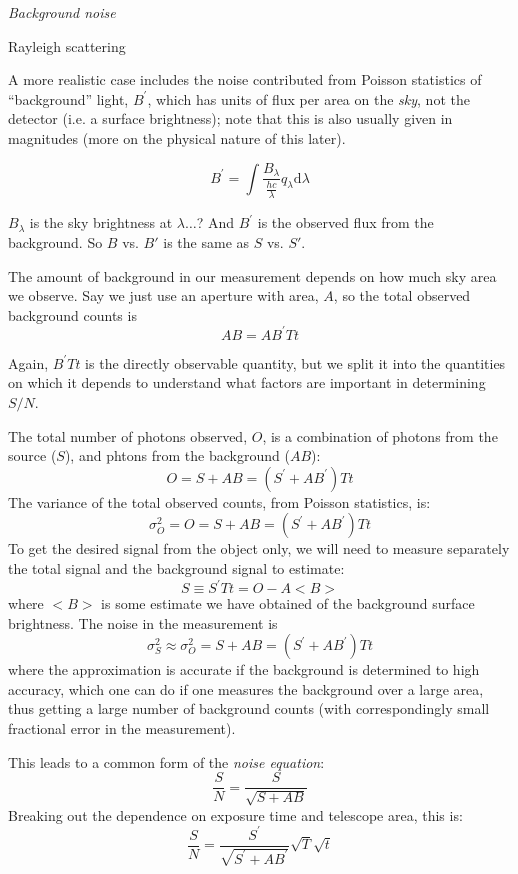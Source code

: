 \documentclass[12pt]{article}
\begin{document}
\textcolor{om}{\emph{}}

\emph{Background noise}

\textcolor{myBlue}{Rayleigh scattering}

A more realistic case includes the noise contributed from Poisson
statistics of ``background'' light, $B^{\prime}$,
which has units of flux per area
on the \emph{sky}, not the detector
(i.e. a surface brightness); note that this is also usually
given in magnitudes (more on the physical nature of
this later).

    $$ B^{\prime} = \int \frac{B_{\lambda}}{\frac{hc}{\lambda}}
       q_{\lambda}\textrm{d}\lambda $$

\textcolor{myBlue}{$B_{\lambda}$ is the sky brightness at $\lambda
\ldots$? And $B^{\prime}$ is the observed flux from the background.
So $B$ vs. $B'$ is the same as $S$ vs. $S'$.}

The amount of background in our measurement depends on
how much sky area we observe. Say we just
use an aperture with area, $A$, so the total observed background counts
is
    $$ AB = AB^{\prime}Tt $$

Again, $B^{\prime}Tt$ is the directly observable quantity,
but we split it into the quantities on which it depends to understand
what factors are important in determining $S/N$.

The total number of photons observed, $O$, is a combination of
photons from the source ($S$), and phtons from the background ($AB$):
    $$ O = S + AB = (S^{\prime} + AB^{\prime})Tt $$
The variance of the total observed counts, from Poisson statistics,
is:
    $$ \sigma^2_O = O =  S + AB = (S^{\prime} + AB^{\prime})Tt $$
To get the desired signal from the object only, we will need to
measure separately the total signal and the background signal to
estimate:
    $$ S \equiv S^{\prime}Tt = O-A <B> $$
where $<B>$ is some estimate we have obtained of the background
surface brightness. The noise in the measurement is
    $$ \sigma^2_S \approx \sigma^2_O =
    S + AB = (S^{\prime} + AB^{\prime})Tt $$
where the approximation is accurate if the background is determined to
high accuracy, which one can do if one measures the background over a
large area, thus getting a large number of background counts (with
correspondingly small fractional error in the measurement).

This leads to a common form of the \emph{noise equation}:
    $$ \frac{S}{N} = \frac{S}{\sqrt{S+AB}}  $$
Breaking out the dependence on exposure time and telescope area, this
is:
    $$ \frac{S}{N} = \frac{S^{\prime}}
    {\sqrt{S^{\prime}+AB^{\prime}}}
    \sqrt{T}\sqrt{t}$$
\end{document}
